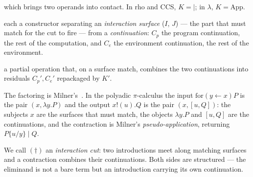 \documentclass[11pt]{article}
\theoremstyle{definition}
\theoremstyle{plain}
\theoremstyle{remark}
\newcommand{\compute}{\mathrm{compute}}
\begin{document}
\begin{description}[leftmargin=1.5em,style=nextline]
\item[the interaction constructor $K$,] which brings two operands into contact. In rho
  and CCS, $K = {\mid}$; in $\lambda$, $K = \mathrm{App}$.

\item[two introductions $K_p(I,C_p)$ and $K_e(J,C_e)$,] each a constructor separating an
  \emph{interaction surface} ($I$, $J$) --- the part that must match for the cut to fire
  --- from a \emph{continuation}: $C_p$ the program continuation, the rest of the
  computation, and $C_e$ the environment continuation, the rest of the environment.

\item[the contraction $\compute$,] a partial operation that, on a surface match,
  combines the two continuations into residuals $C_p', C_e'$ repackaged by $K'$.
\end{description}

The factoring is Milner's~\cite{Milner1992}. In the polyadic $\pi$-calculus the input
$\mathrm{for}(y \leftarrow x)P$ is the pair $(x, \lambda y.P)$ and the output $x!(u).Q$
is the pair $(x, [u,Q])$: the subjects $x$ are the surfaces that must match, the objects
$\lambda y.P$ and $[u,Q]$ are the continuations, and the contraction is Milner's
\emph{pseudo-application}, returning $P\{u/y\} \mid Q$.

\begin{center}
\end{center}

We call $(\dagger)$ an \emph{interaction cut}: two introductions meet along matching
surfaces and a contraction combines their continuations. Both sides are structured ---
the eliminand is not a bare term but an introduction carrying its own continuation.
\end{document}

